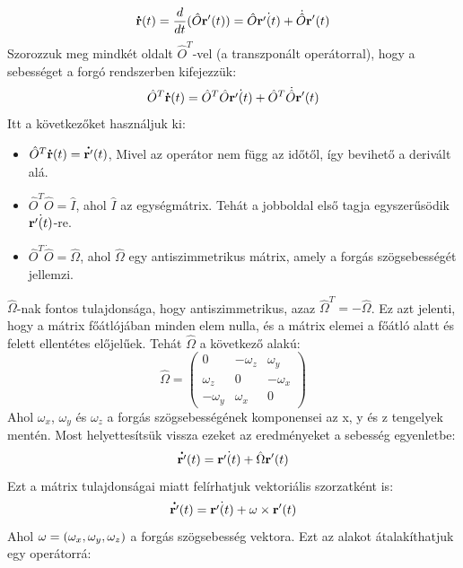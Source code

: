 \documentclass[../main.tex]{subfiles}
\begin{document}
\begin{equation}
    \bold{\dot{r}}(t) = \frac{d}{dt}(\hat{O}\bold{r'}(t)) = \hat{O}\dot{\bold{r'}(t)} + \dot{\hat{O}}\bold{r'}(t)
\end{equation}
Szorozzuk meg mindkét oldalt $\hat{O}^T$-vel (a transzponált operátorral), hogy a sebességet a forgó rendszerben kifejezzük:
\begin{equation}
    \hat{O}^T\bold{\dot{r}}(t) = \hat{O}^T\hat{O}\dot{\bold{r'}(t)} + \hat{O}^T\dot{\hat{O}}\bold{r'}(t)
\end{equation}
Itt a következőket használjuk ki:
\begin{itemize}
    \item $\hat{O}^T\bold{\dot{r}}(t) = \bold{\dot{r'}}(t)$, Mivel az operátor nem függ az időtől, így bevihető a derivált alá.
    \item $\hat{O}^T\hat{O} = \hat{I}$, ahol $\hat{I}$ az egységmátrix. Tehát a jobboldal első tagja egyszerűsödik $\dot{\bold{r'}(t)}$-re.
    \item $\hat{O}^T\dot{\hat{O}} = \hat{\Omega}$, ahol $\hat{\Omega}$ egy antiszimmetrikus mátrix, amely a forgás szögsebességét jellemzi.
\end{itemize}
$\hat{\Omega}$-nak fontos tulajdonsága, hogy antiszimmetrikus, azaz $\hat{\Omega}^T = -\hat{\Omega}$. Ez azt jelenti, hogy a mátrix főátlójában minden elem nulla, és a mátrix elemei a főátló alatt és felett ellentétes előjelűek.
Tehát $\hat{\Omega}$ a következő alakú:
\begin{equation}
    \hat{\Omega} = \begin{pmatrix}
    0 & -\omega_z & \omega_y \\
    \omega_z & 0 & -\omega_x \\
    -\omega_y & \omega_x & 0
    \end{pmatrix}
\end{equation}
Ahol $\omega_x$, $\omega_y$ és $\omega_z$ a forgás szögsebességének komponensei az x, y és z tengelyek mentén.
Most helyettesítsük vissza ezeket az eredményeket a sebesség egyenletbe:
\begin{equation}
    \bold{\dot{r'}}(t) = \dot{\bold{r'}(t)} + \hat{\Omega}\bold{r'}(t)
\end{equation}
Ezt a mátrix tulajdonságai miatt felírhatjuk vektoriális szorzatként is:
\begin{equation}
    \bold{\dot{r'}}(t) = \dot{\bold{r'}(t)} + \bold{\omega} \times \bold{r'}(t)
\end{equation}
Ahol $\bold{\omega} = (\omega_x, \omega_y, \omega_z)$ a forgás szögsebesség vektora. Ezt az alakot átalakíthatjuk egy operátorrá:
\end{document}
